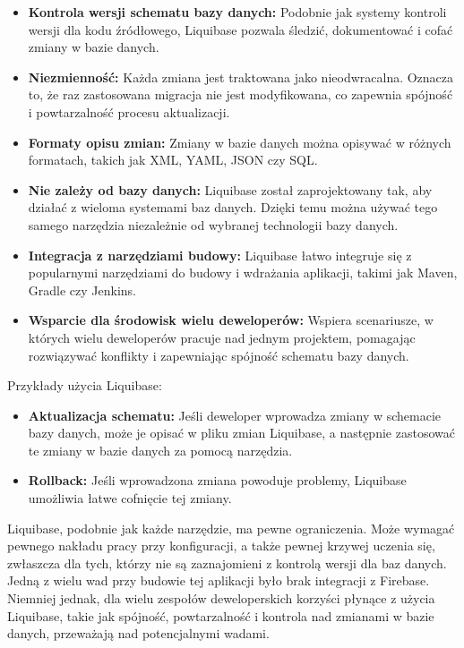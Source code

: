 \begin{itemize}
\item \textbf{Kontrola wersji schematu bazy danych:} Podobnie jak systemy kontroli wersji dla kodu źródłowego, Liquibase pozwala śledzić, dokumentować i cofać zmiany w bazie danych.

\item \textbf{Niezmienność:} Każda zmiana jest traktowana jako nieodwracalna. Oznacza to, że raz zastosowana migracja nie jest modyfikowana, co zapewnia spójność i powtarzalność procesu aktualizacji.

\item \textbf{Formaty opisu zmian:} Zmiany w bazie danych można opisywać w różnych formatach, takich jak XML, YAML, JSON czy SQL.

\item \textbf{Nie zależy od bazy danych:} Liquibase został zaprojektowany tak, aby działać z wieloma systemami baz danych. Dzięki temu można używać tego samego narzędzia niezależnie od wybranej technologii bazy danych.

\item \textbf{Integracja z narzędziami budowy:} Liquibase łatwo integruje się z popularnymi narzędziami do budowy i wdrażania aplikacji, takimi jak Maven, Gradle czy Jenkins.

\item \textbf{Wsparcie dla środowisk wielu deweloperów:} Wspiera scenariusze, w których wielu deweloperów pracuje nad jednym projektem, pomagając rozwiązywać konflikty i zapewniając spójność schematu bazy danych.
\end{itemize}
Przykłady użycia Liquibase:

\begin{itemize}
\item \textbf{Aktualizacja schematu:} Jeśli deweloper wprowadza zmiany w schemacie bazy danych, może je opisać w pliku zmian Liquibase, a następnie zastosować te zmiany w bazie danych za pomocą narzędzia.

\item \textbf{Rollback:} Jeśli wprowadzona zmiana powoduje problemy, Liquibase umożliwia łatwe cofnięcie tej zmiany.
\end{itemize}
Liquibase, podobnie jak każde narzędzie, ma pewne ograniczenia. Może wymagać pewnego nakładu pracy przy konfiguracji, a także pewnej krzywej uczenia się, zwłaszcza dla tych, którzy nie są zaznajomieni z kontrolą wersji dla baz danych. Jedną z wielu wad przy budowie tej aplikacji było brak integracji z Firebase. Niemniej jednak, dla wielu zespołów deweloperskich korzyści płynące z użycia Liquibase, takie jak spójność, powtarzalność i kontrola nad zmianami w bazie danych, przeważają nad potencjalnymi wadami.

